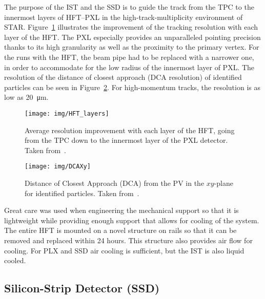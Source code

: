 The purpose of the IST and the SSD is to guide the track from the TPC to the innermost layers of HFT--PXL in the high-track-multiplicity environment of STAR. Figure~\ref{HFT_layers} illustrates the improvement of the tracking resolution with each layer of the HFT\@. The PXL especially provides an unparalleled pointing precision thanks to its high granularity as well as the proximity to the primary vertex. For the runs with the HFT, the beam pipe had to be replaced with a narrower one, in order to accommodate for the low radius of the innermost layer of PXL\@. The resolution of the distance of closest approach (DCA resolution) of identified particles can be seen in Figure~\ref{DCA}. For high-momentum tracks, the resolution is as low as \SI{20}{\micro\metre}.

\begin{figure}[!htb]
\begin{center}
 \texttt{[image: img/HFT\_layers]}\\
\end{center}
\caption[Average resolution improvement with each layer of the HFT.]{\label{HFT_layers}Average resolution improvement with each layer of the HFT, going from the TPC down to the innermost layer of the PXL detector. Taken from~\cite{KubaVyzkumak}.}
\end{figure}

\begin{figure}[!htb]
\begin{center}
 \texttt{[image: img/DCAXy]}\\
\end{center}
\caption[DCA from the PV in the $xy$-plane for identified particles.]{\label{DCA}Distance of Closest Approach (DCA) from the PV in the $xy$-plane for identified particles. Taken from~\cite{D0v2paper}.}
\end{figure}


Great care was used when engineering the mechanical support so that it is lightweight while providing enough support that allows for cooling of the system. The entire HFT is mounted on a novel structure on rails so that it can be removed and replaced within 24 hours. This structure also provides air flow for cooling. For PLX and SSD  air cooling is sufficient, but the IST is also liquid cooled.

\subsection{Silicon-Strip Detector (SSD)}

